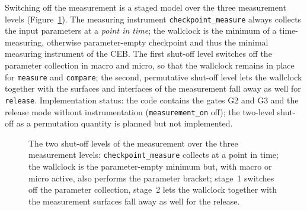 \begin{nurkurz}
Switching off the measurement is a staged model over the three measurement levels
(Figure~\ref{fig:abschaltungsstufen}). The measuring instrument \texttt{checkpoint\_measure} always
collects the input parameters at a \emph{point in time}; the wallclock is the minimum of a
time-measuring, otherwise parameter-empty checkpoint and thus the minimal measuring instrument of the
CEB\@. The first shut-off level switches off the parameter collection in macro and micro, so that the
wallclock remains in place for \texttt{measure} and \texttt{compare}; the second, permutative shut-off
level lets the wallclock together with the surfaces and interfaces of the measurement fall away as
well for \texttt{release}. Implementation status: the code contains the gates G2 and G3 and the release
mode without instrumentation (\texttt{measurement\_on} off); the two-level shut-off as a permutation
quantity is planned but not implemented.
\begin{figure}[htbp]\centering
{}
\caption[The two shut-off levels of the measurement]{The two shut-off levels of the measurement over the three measurement levels:
\texttt{checkpoint\_measure} collects at a point in time; the wallclock is the parameter-empty minimum
but, with macro or micro active, also performs the parameter bracket; stage~1 switches off the
parameter collection, stage~2 lets the wallclock together with the measurement surfaces fall away as
well for the release.}\label{fig:abschaltungsstufen}
\end{figure}
\end{nurkurz}

